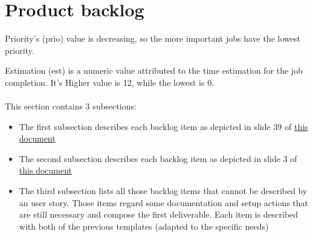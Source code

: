 \section{Product backlog} \label{product_backlog}
Priority's (prio) value is decreasing, so the more important jobs have the lowest priority.

Estimation (est) is a numeric value attributed to the time estimation for the job completion. It's Higher value is 12, while the lowest is 0.
\\ \\
This section contains 3 subsections: 
\begin{itemize}
	\item The first subsection describes each backlog item as depicted in slide 39 of \href{https://didatticaonline.unitn.it/dol/pluginfile.php/1827830/mod_resource/content/1/SW-eng-L15-Agile.pdf}{this document} 
	\item The second subsection describes each backlog item as depicted in slide 3 of \href{https://didatticaonline.unitn.it/dol/pluginfile.php/1828441/mod\_resource/content/1/SW-eng-L16-Agile-hands-on.pdf}{this document}
	\item The third subsection lists all those backlog items that cannot be described by an user story. Those items regard some documentation and setup actions that are still necessary and compose the first deliverable. Each item is described with both of the previous templates (adapted to the specific needs)
\end{itemize}


\newpage
